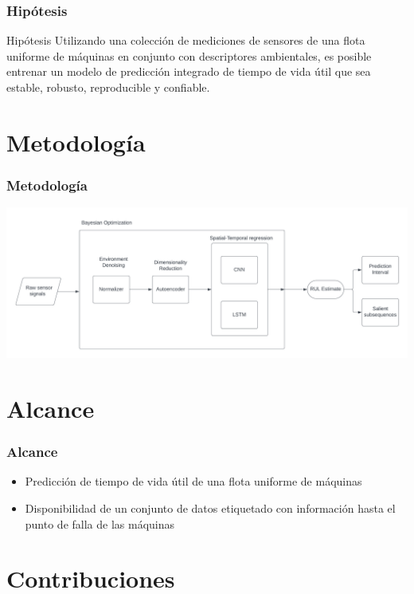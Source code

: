 \documentclass{beamer}
\begin{document}
        \begin{frame}
            \frametitle{Hipótesis}

            \begin{exampleblock}{Hipótesis}
                Utilizando una colección de mediciones de sensores de una flota uniforme de máquinas en conjunto con descriptores ambientales, es posible entrenar un modelo de predicción integrado de tiempo de vida útil que sea estable, robusto, reproducible y confiable.
            \end{exampleblock}
        \end{frame}

    \section{Metodología}

        \begin{frame}
            \frametitle{Metodología}
            \centering
            \includegraphics[scale=0.4]{img/pdm-ml-process.png}
        \end{frame}

    \section{Alcance}

        \begin{frame}
            \frametitle{Alcance}
            \begin{itemize}
                \item Predicción de tiempo de vida útil de una flota uniforme de máquinas
                \item Disponibilidad de un conjunto de datos etiquetado con información hasta el punto de falla de las máquinas
            \end{itemize}
        \end{frame}

    \section{Contribuciones}
\end{document}
